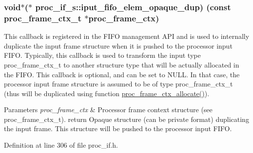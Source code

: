 \subsubsection[{\texorpdfstring{iput\+\_\+fifo\+\_\+elem\+\_\+opaque\+\_\+dup}{iput_fifo_elem_opaque_dup}}]{\setlength{\rightskip}{0pt plus 5cm}void$\ast$($\ast$ proc\+\_\+if\+\_\+s\+::iput\+\_\+fifo\+\_\+elem\+\_\+opaque\+\_\+dup) (const {\bf proc\+\_\+frame\+\_\+ctx\+\_\+t} $\ast$proc\+\_\+frame\+\_\+ctx)}\hypertarget{structproc__if__s_a558cec57df436699d4154775894f2313}{}\label{structproc__if__s_a558cec57df436699d4154775894f2313}
This callback is registered in the F\+I\+FO management A\+PI and is used to internally duplicate the input frame structure when it is pushed to the processor input F\+I\+FO. Typically, this callback is used to transform the input type proc\+\_\+frame\+\_\+ctx\+\_\+t to another structure type that will be actually allocated in the F\+I\+FO. This callback is optional, and can be set to N\+U\+LL. In that case, the processor input frame structure is assumed to be of type proc\+\_\+frame\+\_\+ctx\+\_\+t (thus will be duplicated using function \textquotesingle{}\hyperlink{proc__if_8c_a26df07b260850afd03ec73572608a034}{proc\+\_\+frame\+\_\+ctx\+\_\+allocate()}\textquotesingle{}). 
\begin{DoxyParams}{Parameters}
{\em proc\+\_\+frame\+\_\+ctx} & Processor frame context structure (see proc\+\_\+frame\+\_\+ctx\+\_\+t). return Opaque structure (can be private format) duplicating the input frame. This structure will be pushed to the processor input F\+I\+FO. \\
\hline
\end{DoxyParams}


Definition at line 306 of file proc\+\_\+if.\+h.

